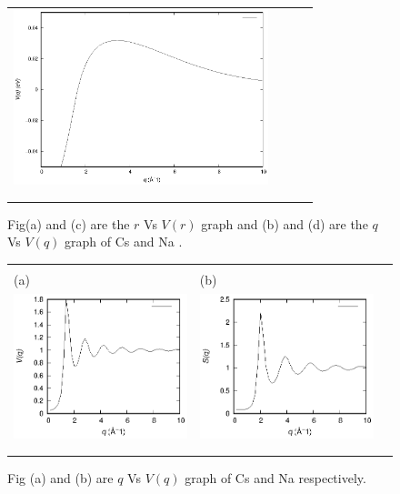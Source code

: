 \documentclass[final,12pt]{elsarticle}
\begin{document}
{\begin{figure}[htp]
\begin{center}
\begin{tabular}{llll}
\includegraphics[width=7.4cm]{iNaFFACT.eps}\\&\\&\\

\end{tabular}
\caption{Fig(a) and (c) are the $r$ Vs $V(r)$ graph and (b) and (d) are the $q$ Vs $V(q)$ graph of Cs and Na .}
\label{pfig1}
\end{center}
\end{figure}

\begin{figure}[htp]
\begin{center}
\begin{tabular} {lll}
\vspace{2.0cm}
\\(a)& (b) \\
\includegraphics[width=7.4cm]{iCsS(q).eps}&
\includegraphics[width=7.4cm]{iNaS(q).eps}\\&\\&\\
\end{tabular}
\caption{Fig (a) and (b) are $ q $ Vs $V(q)$ graph of Cs and Na respectively.}
\label{pfig2}
\end{center}
\end{figure}

}
\end{document}
